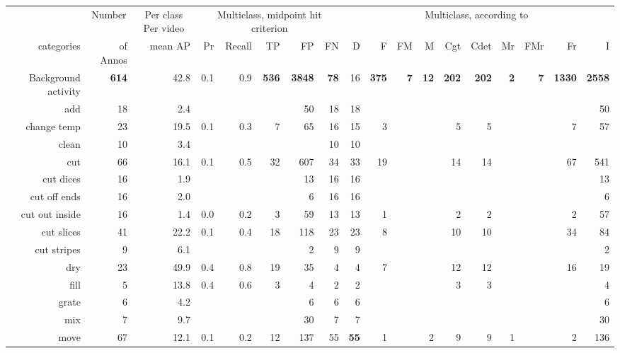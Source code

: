 \begin{tabular}{r r r r@{\ \ }r@{\ \ }r@{\ \ }r@{\ \ }r r@{\ \ }r@{\ \ }r@{\ \ }r@{\ \ }r@{\ \ }r@{\ \ }r@{\ \ }r@{\ \ }r@{\ \ }r}
\toprule  & \multicolumn{1}{c}{Number}  & \multicolumn{1}{c}{Per class Per video}  & \multicolumn{5}{c}{Multiclass, midpoint hit criterion}  & \multicolumn{10}{c}{Multiclass, according to~\cite{ward11tist}} \\
categories&of Annos&mean AP&Pr&Recall&TP&FP&FN&D&F&FM&M&Cgt&Cdet&Mr&FMr&Fr&I\\
\cmidrule(lr){1-1} \cmidrule(lr){2-2} \cmidrule(lr){3-3} \cmidrule(lr){4-8} \cmidrule(lr){9-18}
 Background activity & \textbf{614} & 42.8 & 0.1 & 0.9 & \textbf{536} & \textbf{3848} & \textbf{78} & 16 & \textbf{375} & \textbf{7} & \textbf{12} & \textbf{202} & \textbf{202} & \textbf{2} & \textbf{7} & \textbf{1330} & \textbf{2558} \\
add & 18 & 2.4 &  &  &  & 50 & 18 & 18 &  &  &  &  &  &  &  &  & 50 \\
change temp & 23 & 19.5 & 0.1 & 0.3 & 7 & 65 & 16 & 15 & 3 &  &  & 5 & 5 &  &  & 7 & 57 \\
clean & 10 & 3.4 &  &  &  &  & 10 & 10 &  &  &  &  &  &  &  &  &  \\
cut & 66 & 16.1 & 0.1 & 0.5 & 32 & 607 & 34 & 33 & 19 &  &  & 14 & 14 &  &  & 67 & 541 \\
cut dices & 16 & 1.9 &  &  &  & 13 & 16 & 16 &  &  &  &  &  &  &  &  & 13 \\
cut off ends & 16 & 2.0 &  &  &  & 6 & 16 & 16 &  &  &  &  &  &  &  &  & 6 \\
cut out inside & 16 & 1.4 & 0.0 & 0.2 & 3 & 59 & 13 & 13 & 1 &  &  & 2 & 2 &  &  & 2 & 57 \\
cut slices & 41 & 22.2 & 0.1 & 0.4 & 18 & 118 & 23 & 23 & 8 &  &  & 10 & 10 &  &  & 34 & 84 \\
cut stripes & 9 & 6.1 &  &  &  & 2 & 9 & 9 &  &  &  &  &  &  &  &  & 2 \\
dry & 23 & 49.9 & 0.4 & 0.8 & 19 & 35 & 4 & 4 & 7 &  &  & 12 & 12 &  &  & 16 & 19 \\
fill & 5 & 13.8 & 0.4 & 0.6 & 3 & 4 & 2 & 2 &  &  &  & 3 & 3 &  &  &  & 4 \\
grate & 6 & 4.2 &  &  &  & 6 & 6 & 6 &  &  &  &  &  &  &  &  & 6 \\
mix & 7 & 9.7 &  &  &  & 30 & 7 & 7 &  &  &  &  &  &  &  &  & 30 \\
move & 67 & 12.1 & 0.1 & 0.2 & 12 & 137 & 55 & \textbf{55} & 1 &  & 2 & 9 & 9 & 1 &  & 2 & 136 \\

\end{tabular}
